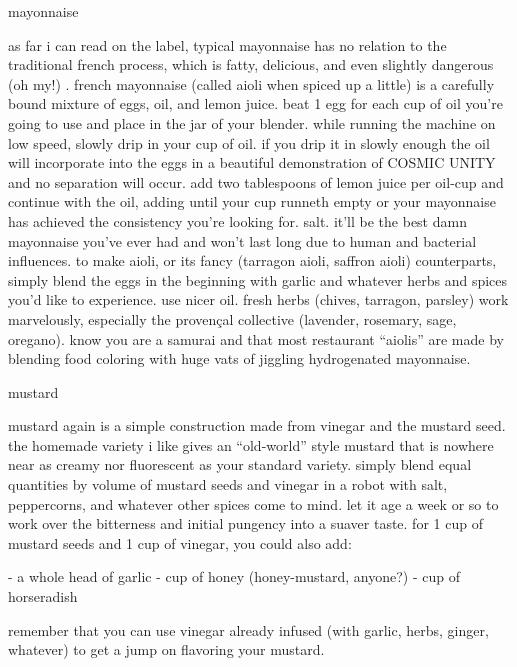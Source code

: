 mayonnaise

as far i can read on the label, typical mayonnaise has no relation to the traditional french process, which is fatty, delicious, and even slightly dangerous (oh my!) . french mayonnaise (called aioli when spiced up a little) is a carefully bound mixture of eggs, oil, and lemon juice. beat 1 egg for each cup of oil you're going to use and place in the jar of your blender. while running the machine on low speed, slowly drip in your cup of oil. if you drip it in slowly enough the oil will incorporate into the eggs in a beautiful demonstration of COSMIC UNITY and no separation will occur. add two tablespoons of lemon juice per oil-cup and continue with the oil, adding until your cup runneth empty or your mayonnaise has achieved the consistency you're looking for. salt. it'll be the best damn mayonnaise you've ever had and won't last long due to human and bacterial influences.
	to make aioli, or its fancy (tarragon aioli, saffron aioli) counterparts, simply blend the eggs in the beginning with garlic and whatever herbs and spices you'd like to experience. use nicer oil. fresh herbs (chives, tarragon, parsley) work marvelously, especially the proven\c{c}al collective (lavender, rosemary, sage, oregano). know you are a samurai and that most restaurant ``aiolis'' are made by blending food coloring with huge vats of jiggling hydrogenated mayonnaise.

mustard

mustard again is a simple construction made from vinegar and the mustard seed. the homemade variety i like gives an ``old-world'' style mustard that is nowhere near as creamy nor fluorescent as your standard variety. simply blend equal quantities by volume of mustard seeds and vinegar in a robot with salt, peppercorns, and whatever other spices come to mind. let it age a week or so to work over the bitterness and initial pungency into a suaver taste.
	for 1 cup of mustard seeds and 1 cup of vinegar, you could also add:

- a whole head of garlic
- \threequarters cup of honey (honey-mustard, anyone?)
- \onequarter cup of horseradish

remember that you can use vinegar already infused (with garlic, herbs, ginger, whatever) to get a jump on flavoring your mustard.
